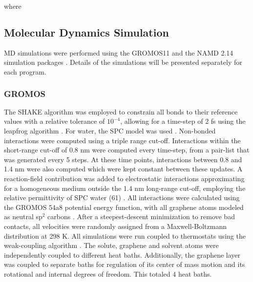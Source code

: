\documentclass[twoside,twocolumn,9pt]{article}
\begin{document}
where




\subsection{Molecular Dynamics Simulation}

MD simulations were performed using the GROMOS11 \cite{Riniker_2011,
  Schmid_2012} and the NAMD 2.14 simulation packages
\cite{Phillips_2020}.  Details of the simulations will be presented
separately for each program.

\subsubsection{GROMOS}

The SHAKE algorithm \cite{Ryckaert_1977} was employed to constrain all
bonds to their reference values with a relative tolerance of
$10^{-4}$, allowing for a time-step of 2 fs using the leapfrog
algorithm \cite{Hockney_1977}.  For water, the SPC model was used
\cite{Berendsen_1981}.  Non-bonded interactions were computed using a
triple range cut-off. Interactions within the short-range cut-off of
0.8 nm were computed every time-step, from a pair-list that was
generated every 5 steps.  At these time points, interactions between
0.8 and 1.4 nm were also computed which were kept constant between
these updates.  A reaction-field contribution was added to
electrostatic interactions approximating for a homogeneous medium
outside the 1.4 nm long-range cut-off, employing the relative
permittivity of SPC water (61) \cite{Tironi_1995}. All interactions
were calculated using the GROMOS 54a8 potential energy function, with
all graphene atoms modeled as neutral sp$^2$ carbons \cite{Reif_2012}.
After a steepest-descent minimization to remove bad contacts, all
velocities were randomly assigned from a Maxwell-Boltzmann
distribution at 298 K.  All simulations were run coupled to
thermostats using the weak-coupling algorithm
\cite{Berendsen_1984}. The solute, graphene and solvent atoms were
independently coupled to different heat baths. Additionally, the
graphene layer was coupled to separate baths for regulation of its
center of mass motion and its rotational and internal degrees of
freedom. This totaled 4 heat baths.
\end{document}
